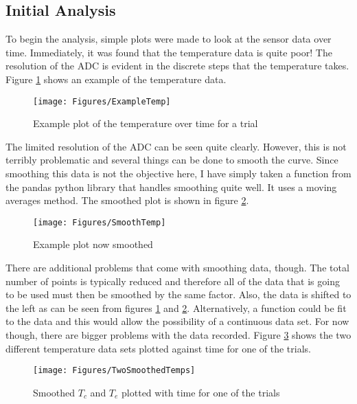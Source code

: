 \subsection{Initial Analysis}
To begin the analysis, simple plots were made to look at the sensor data over time. Immediately, it was found that the temperature data is quite poor! The resolution of the ADC is evident in the discrete steps that the temperature takes. Figure \ref{fig:BadTemp} shows an example of the temperature data.
\begin{figure}[h!]
\centering
\texttt{[image: Figures/ExampleTemp]}
\caption{Example plot of the temperature over time for a trial}
\label{fig:BadTemp}
\end{figure}
The limited resolution of the ADC can be seen quite clearly. However, this is not terribly problematic and several things can be done to smooth the curve. Since smoothing this data is not the objective here, I have simply taken a function from the pandas python library that handles smoothing quite well. It uses a moving averages method. The smoothed plot is shown in figure \ref{fig:SmoothedTemp}.
\begin{figure}[h!]
\centering
\texttt{[image: Figures/SmoothTemp]}
\caption{Example plot now smoothed}
\label{fig:SmoothedTemp}
\end{figure}
There are additional problems that come with smoothing data, though. The total number of points is typically reduced and therefore all of the data that is going to be used must then be smoothed by the same factor. Also, the data is shifted to the left as can be seen from figures \ref{fig:BadTemp} and \ref{fig:SmoothedTemp}. Alternatively, a function could be fit to the data and this would allow the possibility of a continuous data set. For now though, there are bigger problems with the data recorded. Figure \ref{fig:BothTemps} shows the two different temperature data sets plotted against time for one of the trials. 
\begin{figure}[h!]
\centering
\texttt{[image: Figures/TwoSmoothedTemps]}
\caption{Smoothed $T_c$ and $T_e$ plotted with time for one of the trials}
\label{fig:BothTemps}
\end{figure}
